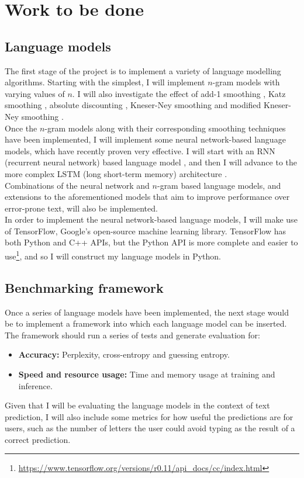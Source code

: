 \documentclass[a4paper, 12pt]{article}
\newcommand{\tbf}[1]{\textbf{#1}}
\newcommand{\hlink}[2]{{\href{#1}{#2}}}
\begin{document}
\section*{Work to be done}

\subsection*{Language models}
The first stage of the project is to implement a variety of language modelling algorithms. Starting with the simplest, I will implement $n$-gram models with varying values of $n$. I will also investigate the effect of add-1 smoothing \cite{add1}, Katz smoothing \cite{katz}, absolute discounting \cite{absdisc}, Kneser-Ney smoothing \cite{kneser} and modified Kneser-Ney smoothing \cite{modkneser}. \\

Once the $n$-gram models along with their corresponding smoothing techniques have been implemented, I will implement some neural network-based language models, which have recently proven very effective. I will start with an RNN (recurrent neural network) based language model \cite{mikolov}, and then I will advance to the more complex LSTM (long short-term memory) architecture \cite{lstm}. \\

Combinations of the neural network and $n$-gram based language models, and extensions to the aforementioned models that aim to improve performance over error-prone text, will also be implemented. \\

In order to implement the neural network-based language models, I will make use of TensorFlow, Google's open-source machine learning library. TensorFlow has both Python and C++ APIs, but the Python API is more complete and easier to use\footnote{\hlink{https://www.tensorflow.org/versions/r0.11/api\_docs/cc/index.html}{https://www.tensorflow.org/versions/r0.11/api\_docs/cc/index.html}}, and so I will construct my language models in Python.

\subsection*{Benchmarking framework}
Once a series of language models have been implemented, the next stage would be to implement a framework into which each language model can be inserted. The framework should run a series of tests and generate evaluation for:
\begin{itemize}
\item
	\tbf{Accuracy:} Perplexity, cross-entropy and guessing entropy.
\item
	\tbf{Speed and resource usage:} Time and memory usage at training and inference.
\end{itemize}
Given that I will be evaluating the language models in the context of text prediction, I will also include some metrics for how useful the predictions are for users, such as the number of letters the user could avoid typing as the result of a correct prediction. 
\end{document}
